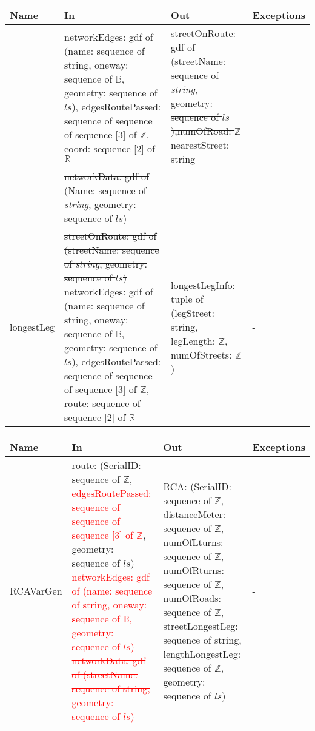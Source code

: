 \documentclass[12pt, titlepage]{article}
\begin{document}
\begin{center}
\begin{tabular}{| >{\raggedright}p{3cm} | >{\raggedright}p{4cm} | >{\raggedright}p{4cm} | l |}
\hline
\textbf{Name} & \textbf{In} & \textbf{Out} & \textbf{Exceptions} \\
\hline
\noindent{\color{red}\sout{mapLegToStreet} findNearestStreet} & \noindent \color{red} networkEdges: gdf of (name: sequence of string, oneway: sequence of $\mathbb{B}$, geometry: sequence of $ls$), \newline edgesRoutePassed: sequence of sequence of sequence [3] of $\mathbb{Z}$, \newline coord: sequence [2] of $\mathbb{R}$ & \noindent \color{red} \sout{streetOnRoute: gdf of (streetName: sequence of \textit{string}, geometry: sequence of $ls$),\newline numOfRoad: $\mathbb{Z}$} \newline nearestStreet: string & - \\
 & \noindent \color{red} \sout{networkData: gdf of (Name: sequence of \textit{string}, geometry: sequence of $ls$)} & & \\
\hline
longestLeg & \noindent \color{red} \sout{streetOnRoute: gdf of (streetName: sequence of \textit{string}, geometry: sequence of $ls$)} \newline networkEdges: gdf of (name: sequence of string, oneway: sequence of $\mathbb{B}$, geometry: sequence of $ls$), \newline edgesRoutePassed: sequence of sequence of sequence [3] of $\mathbb{Z}$, \newline route: sequence of sequence [2] of $\mathbb{R}$ & \noindent \color{red} 
 longestLegInfo: tuple of (legStreet: string, legLength: $\mathbb{Z}$, numOfStreets: $\mathbb{Z}$) & - \\
\hline
\end{tabular}
\end{center}

\begin{center}
\begin{tabular}{| >{\raggedright}p{3cm} | >{\raggedright}p{4cm} | >{\raggedright}p{4cm} | l |}
\hline
\textbf{Name} & \textbf{In} & \textbf{Out} & \textbf{Exceptions} \\
\hline
RCAVarGen & route: (SerialID: sequence of $\mathbb{Z}$, \textcolor{red}{edgesRoutePassed: sequence of sequence of sequence [3] of $\mathbb{Z}$}, geometry: sequence of $ls$) \newline \textcolor{red}{networkEdges: gdf of (name: sequence of string, oneway: sequence of $\mathbb{B}$, geometry: sequence of $ls$)} \newline \textcolor{red}{\sout{networkData: gdf of (streetName: sequence of string, geometry: sequence of $ls$)}} & \noindent \color{red} RCA: (SerialID: sequence of $\mathbb{Z}$, distanceMeter: sequence of $\mathbb{Z}$, numOfLturns: sequence of $\mathbb{Z}$, numOfRturns: sequence of $\mathbb{Z}$, numOfRoads: sequence of $\mathbb{Z}$, streetLongestLeg: sequence of string, lengthLongestLeg: sequence of $\mathbb{Z}$, geometry: sequence of $ls$) & - \\
\hline
\end{tabular}
\end{center}
\end{document}
